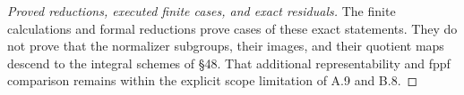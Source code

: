 \begin{proof}[Proved reductions, executed finite cases, and exact residuals]
The finite calculations and formal reductions prove cases
of these exact statements.  They do not prove that the
normalizer subgroups, their images, and their quotient
maps descend to the integral schemes of \S48.
That additional representability and fppf comparison remains
within the explicit scope limitation of A.9 and B.8.
\end{proof}
